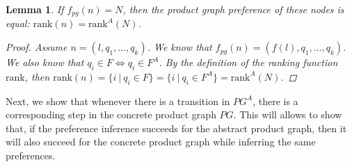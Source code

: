 \documentclass[twocolumn, openany]{sig-alternate-10pt}
\newcommand{\Rank}{\ensuremath{\mathrm{rank}}}
\newtheorem{lem}[thm]{Lemma}
\begin{document}
\begin{lem}
  If $f_{pg}(n) = N$, then the product graph preference of these nodes is equal: $\Rank(n) = \Rank^A(N)$.

  \begin{proof}
    Assume $n = (l,q_1,\dots,q_k)$. We know that $f_{pg}(n) = (f(l),q_1,\dots,q_k)$. 
    We also know that $q_i \in F \iff q_i \in F^A$. 
    By the definition of the ranking function $\Rank$, then 
    $\Rank(n) = \{ i ~\vert~ q_i \in F \} = \{ i ~\vert~ q_i \in F^A \} = \Rank^A(N)$.
  \end{proof}

\end{lem}



%



\vspace{1em}

Next, we show that whenever there is a transition in $PG^A$, there is a corresponding step in the concrete product graph $PG$. This will allows to show that, if the preference inference succeeds for the abstract product graph, then it will also succeed for the concrete product graph while inferring the same preferences.

\vspace{1em}
\end{document}
